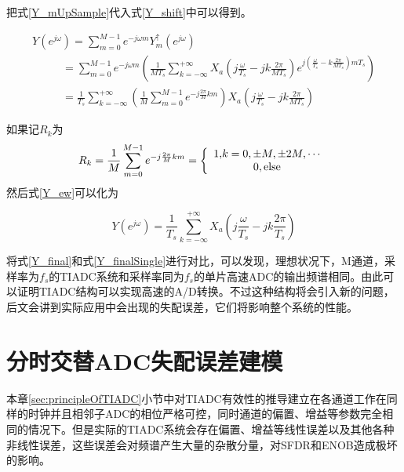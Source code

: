 \begin{enumerate}
			把式\ref{Y_mUpSample}代入式\ref{Y_shift}中可以得到。
				
				\begin{equation}
					\begin{array}{l}
Y({e^{j\omega }}) = \sum\limits_{m = 0}^{M - 1} {{e^{ - j\omega m}}} Y_m^ \uparrow \left( {{e^{j\omega }}} \right)\\
\quad \quad \;\;\, = \sum\limits_{m = 0}^{M - 1} {{e^{ - j\omega m}}\left( {\frac{1}{{M{T_s}}}\sum\limits_{k =  - \infty }^{ + \infty } {{X_a}\left( {j\frac{\omega }{{{T_s}}} - jk\frac{{2\pi }}{{M{T_s}}}} \right)} {e^{j\left( {\frac{\omega }{{{T_s}}} - k\frac{{2\pi }}{{M{T_s}}}} \right)m{T_s}}}} \right)} \\
\quad \quad \;\;\, = \frac{1}{{{T_s}}}\sum\limits_{k =  - \infty }^{ + \infty } {\left( {\frac{1}{M}\sum\limits_{m = 0}^{M - 1} {{e^{ - j\frac{{2\pi }}{M}km}}} } \right)} {X_a}\left( {j\frac{\omega }{{{T_s}}} - jk\frac{{2\pi }}{{M{T_s}}}} \right)
\end{array} \label{Y_ew}
				\end{equation}
			
			如果记$R_k$为
			\begin{equation}
				{R_k} = \frac{1}{M}\sum\limits_{m = 0}^{M - 1} {{e^{ - j\frac{{2\pi }}{M}km}}}  = \left\{ {\begin{array}{*{20}{c}}
{1{\rm{   ,}}k = 0, \pm M, \pm 2M, \cdots }\\
{0{\rm{  ,else                   }}}
\end{array}} \right.{\rm{   }}
			\end{equation}
		然后式\ref{Y_ew}可以化为
		
			\begin{equation}
				Y({e^{j\omega }}) = \frac{1}{{{T_s}}}\sum\limits_{k =  - \infty }^{ + \infty } {{X_a}\left( {j\frac{\omega }{{{T_s}}} - jk\frac{{2\pi }}{{{T_s}}}} \right)}  \label{Y_final}
			\end{equation}
		
		将式\ref{Y_final}和式\ref{Y_finalSingle}进行对比，可以发现，理想状况下，M通道，采样率为$f_s$的TIADC系统和采样率同为$f_s$的单片高速ADC的输出频谱相同。由此可以证明TIADC结构可以实现高速的A/D转换。不过这种结构将会引入新的问题，后文会讲到实际应用中会出现的失配误差，它们将影响整个系统的性能。	
		\end{enumerate}
\section{分时交替ADC失配误差建模}
	本章\ref{sec:principleOfTIADC}小节中对TIADC有效性的推导建立在各通道工作在同样的时钟并且相邻子ADC的相位严格可控，同时通道的偏置、增益等参数完全相同的情况下。但是实际的TIADC系统会存在偏置、增益等线性误差以及其他各种非线性误差，这些误差会对频谱产生大量的杂散分量，对SFDR和ENOB造成极坏的影响。\par
